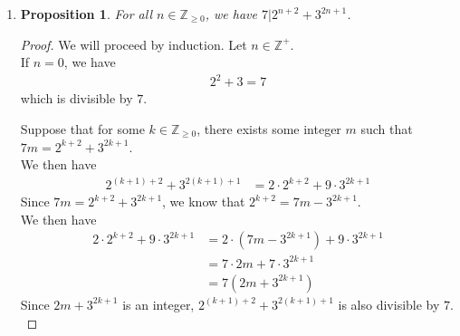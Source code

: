 \documentclass{article}
\newtheorem{prop}[thm]{Proposition}
\begin{document}
\begin{enumerate}
\begin{proof}
    If $n = 5$, we have $4\cdot5 = 20 < 32 = 2^5$. \\

    Suppose that for some $k \in \mathbb{Z}_{\geq 5}$, we have $4k < 2^k$, which also means that $k < 2^{k-2}$. \\
    We then have 
    \begin{align}
        4(k+1) &= 4k + 4 \\
        2^{k+1} &= 2\cdot2^k \\
                &= 8\cdot2^{k-2}
    \end{align}
    Since $k < 2^{k-2}$, we know that $8k < 8\cdot2^{k-2} = 2^{k+1}$. \\
    Since $4m > 4$ for all $m \in \mathbb{Z}_{> 1}$, as $4(m - 1) > 0$, we have $4k + 4 < 4k + 4k = 8k$. \\Since $8k < 8\cdot2^{k-2}$, we have $4k + 4 < 8k < 2^{k+1}$ \\

    Therefore, for all $n \in \mathbb{Z}_{\geq 5}$, we have $4n < 2^n$.
\end{proof}

\item \begin{prop}
    For all $n \in \mathbb{Z}_{\geq 0}$, we have $7|2^{n+2} + 3^{2n+1}$.
\end{prop}
\begin{proof}
    We will proceed by induction. Let $n \in \mathbb{Z}^+$. \\

    If $n = 0$, we have 
    \begin{align}
        2^{2} + 3 = 7
    \end{align}
    which is divisible by $7$.

    Suppose that for some $k \in \mathbb{Z}_{\geq 0}$, there exists some integer $m$ such that $7m = 2^{k+2} + 3^{2k+1}$. \\
    We then have 
    \begin{align}
        2^{(k+1)+2} + 3^{2(k+1)+1} &= 2\cdot2^{k+2} + 9\cdot3^{2k+1}
    \end{align}
    Since $7m = 2^{k+2} + 3^{2k+1}$, we know that $2^{k+2} = 7m - 3^{2k+1}$. \\
    We then have 
    \begin{align}
        2\cdot2^{k+2} + 9\cdot3^{2k+1} &= 2\cdot(7m - 3^{2k+1}) + 9\cdot3^{2k+1} \\
        &= 7\cdot2m + 7\cdot3^{2k+1} \\
        &= 7(2m + 3^{2k+1})
    \end{align}
    Since $2m + 3^{2k+1}$ is an integer, $ 2^{(k+1)+2} + 3^{2(k+1)+1}$ is also divisible by $7$. \\


\end{proof}
\end{enumerate}
\end{document}
